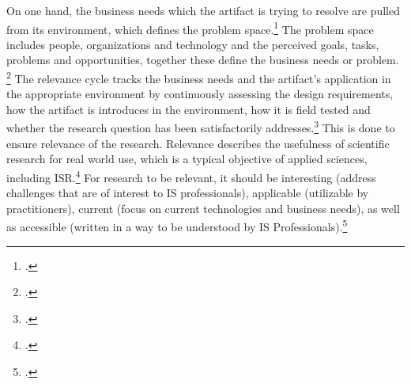 On one hand, the business needs which the artifact is trying to resolve are pulled from its environment, which defines the problem space.\footcites[Cf.][p.??]{Simonsciencesartificial1996}[cf.][p.79]{HevnerDesignScienceResearch2004} The problem space includes people, organizations and technology and the perceived goals, tasks, problems and opportunities, together these define the business needs or problem. \footcite[Cf.][p.79]{HevnerDesignScienceResearch2004} The relevance cycle tracks the business needs and the artifact's application in the appropriate environment by continuously assessing the design requirements, how the artifact is introduces in the environment, how it is field tested and whether the research question has been satisfactorily addresses.\footcite[cf.][p.19]{HevnerDesignResearchInformation2010} This is done to ensure relevance of the research. Relevance describes the usefulness of scientific research for real world use, which is a typical objective of applied sciences, including ISR.\footcite[Cf.][p.129]{ThomasBekannteundweniger2014} For research to be relevant, it should be interesting (address challenges that are of interest to IS professionals), applicable (utilizable by practitioners), current (focus on current technologies and business needs), as well as accessible (written in a way to be understood by IS Professionals).\footcite[Cf.][p.5]{BenbasatEmpiricalresearchinformation1999}

